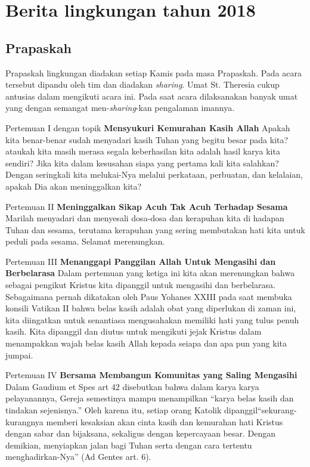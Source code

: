 

\newpage
\section{Berita lingkungan tahun 2018}

\subsection*{Prapaskah}
Prapaskah lingkungan diadakan setiap Kamis pada masa Prapaskah. Pada acara tersebut dipandu oleh tim dan diadakan \textit{sharing}. Umat St. Theresia cukup antusias dalam mengikuti acara ini. Pada saat acara dilaksanakan banyak umat yang dengan semangat men-\textit{sharing}-kan pengalaman imannya. 

Pertemuan I dengan topik \textbf{Mensyukuri Kemurahan Kasih Allah}
Apakah kita benar-benar sudah menyadari kasih Tuhan yang begitu besar pada kita? ataukah kita masih merasa segala keberhasilan kita adalah hasil karya kita sendiri? Jika kita dalam kesusahan siapa yang pertama kali kita salahkan? Dengan seringkali kita melukai-Nya melalui perkataan, perbuatan, dan kelalaian, apakah Dia akan meninggalkan kita?

Pertemuan II \textbf{Meninggalkan Sikap Acuh Tak Acuh Terhadap Sesama}
Marilah menyadari dan menyesali dosa-dosa dan kerapuhan kita di hadapan Tuhan dan sesama, terutama kerapuhan yang sering membutakan hati kita untuk peduli pada sesama. Selamat merenungkan.

Pertemuan III \textbf{Menanggapi Panggilan Allah Untuk Mengasihi dan Berbelarasa}
Dalam pertemuan yang ketiga ini kita akan merenungkan bahwa sebagai pengikut Kristus kita dipanggil untuk mengasihi dan berbelarasa. Sebagaimana pernah dikatakan oleh Paus Yohanes XXIII pada saat membuka konsili Vatikan II bahwa belas kasih adalah obat yang diperlukan di zaman ini, kita diingatkan untuk senantiasa mengusahakan memiliki hati yang tulus penuh kasih. Kita dipanggil dan diutus untuk mengikuti jejak Kristus dalam menampakkan wajah belas kasih Allah kepada seiapa dan apa pun yang kita jumpai.

Pertemuan IV \textbf{Bersama Membangun Komunitas yang Saling Mengasihi}
Dalam Gaudium et Spes art 42 disebutkan bahwa dalam karya karya pelayanannya, Gereja semestinya mampu menampilkan “karya belas kasih dan tindakan sejenisnya.” Oleh karena itu, setiap orang Katolik dipanggil“sekurang-kurangnya memberi kesaksian akan cinta kasih dan kemurahan hati Kristus dengan sabar dan bijaksana, sekaligus dengan kepercayaan besar. Dengan demikian, menyiapkan jalan bagi Tuhan serta dengan cara tertentu menghadirkan-Nya” (Ad Gentes art. 6).

